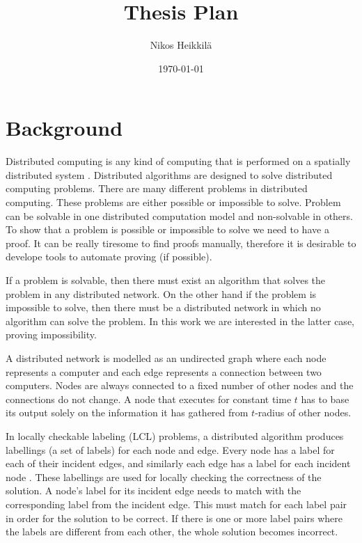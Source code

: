 \documentclass[12pt,a4paper,english,oneside]{article}
\begin{document}
\title{Thesis Plan}
\author{Nikos Heikkilä}
\date{\today}
\maketitle

\section*{Background}

Distributed computing is any kind of computing that is performed on a spatially distributed system
\cite{DBLP:books/el/leeuwen90/LamportL90}.
Distributed algorithms are designed to solve distributed computing problems.
There are many different problems in distributed computing.
These problems are either possible or impossible to solve.
Problem can be solvable in one distributed computation model and non-solvable in others.
To show that a problem is possible or impossible to solve we need to have a proof.
It can be really tiresome to find proofs manually, therefore it is desirable to develope tools to automate proving (if possible).

If a problem is solvable, then there must exist an algorithm that solves the problem in any distributed network.
On the other hand if the problem is impossible to solve, then there must be a distributed network in which no algorithm can solve the problem.
In this work we are interested in the latter case, proving impossibility.

A distributed network is modelled as an undirected graph where each node represents a computer and each edge represents a connection between two computers.
Nodes are always connected to a fixed number of other nodes and the connections do not change.
A node that executes for constant time $t$ has to base its output solely on the information it has gathered from $t$-radius of other nodes.
\cite{DBLP:journals/siamcomp/NaorS95}

In locally checkable labeling (LCL) problems, a distributed algorithm produces labellings (a set of labels) for each node and edge.
Every node has a label for each of their incident edges, and similarly each edge has a label for each incident node
\cite{DBLP:journals/corr/abs-2105-05574}.
These labellings are used for locally checking the correctness of the solution.
A node's label for its incident edge needs to match with the corresponding label from the incident edge.
This must match for each label pair in order for the solution to be correct.
If there is one or more label pairs where the labels are different from each other, the whole solution becomes incorrect.
\end{document}
